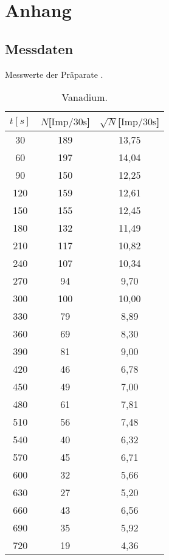 \section{Anhang}


\subsection{Messdaten}
\begin{table}
    \caption*{Messwerte der Präparate \cite{skript}.}
    \begin{minipage}{.5\linewidth}
    \caption{Vanadium.}
    \label{tab:Vanadium}
    \centering
    \begin{tabular}{c c c}
        \toprule   
         $t[s]$ & $N$[$\si{{\text{Imp}}\per{30}\second}$] & $\sqrt{N}$[$\si{{\text{Imp}}\per{30}\second}$]\\
        \midrule
        30    & 189 & 13{,}75\\
        60    & 197 & 14{,}04\\
        90    & 150 & 12{,}25\\
        120   & 159 & 12{,}61\\
        150   & 155 & 12{,}45\\
        180   & 132 & 11{,}49\\
        210   & 117 & 10{,}82\\
        240   & 107 & 10{,}34\\
        270   & 94  & 9{,}70\\
        300   & 100 & 10{,}00\\
        330   & 79  & 8{,}89\\
        360   & 69  & 8{,}30\\
        390   & 81  & 9{,}00\\
        420   & 46  & 6{,}78\\
        450   & 49  & 7{,}00\\
        480   & 61  & 7{,}81\\
        510   & 56  & 7{,}48\\
        540   & 40  & 6{,}32\\
        570   & 45  & 6{,}71\\
        600   & 32  & 5{,}66\\
        630   & 27  & 5{,}20\\
        660   & 43  & 6{,}56\\
        690   & 35  & 5{,}92\\
        720   & 19  & 4{,}36\\

\end{tabular}
\end{minipage}
\end{table}
